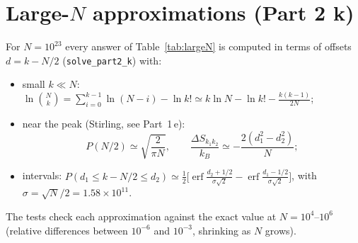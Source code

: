 \section{\texorpdfstring{Large-$N$}{Large-N} approximations (Part 2 k)}
\label{app:largeN}
For $N=10^{23}$ every answer of Table~\ref{tab:largeN} is computed in terms of offsets $d=k-N/2$ (\texttt{solve\_part2\_k}) with:
\begin{itemize}
\item small $k\ll N$: $\ln\binom{N}{k}=\sum_{i=0}^{k-1}\ln(N-i)-\ln k!\simeq k\ln N-\ln k!-\frac{k(k-1)}{2N}$;
\item near the peak (Stirling, see Part~1\,e): \[P(N/2)\simeq\sqrt{\frac{2}{\pi N}},\qquad \frac{\Delta S_{k_1k_2}}{k_B}\simeq-\frac{2(d_1^2-d_2^2)}{N};\]
\item intervals: $P(d_1\le k-N/2\le d_2)\simeq\frac12\bigl[\operatorname{erf}\frac{d_2+1/2}{\sigma\sqrt2}-\operatorname{erf}\frac{d_1-1/2}{\sigma\sqrt2}\bigr]$, with $\sigma=\sqrt N/2=1.58\times10^{11}$.
\end{itemize}
The tests check each approximation against the exact value at $N=10^4$--$10^6$ (relative differences between $10^{-6}$ and $10^{-3}$, shrinking as $N$ grows).

